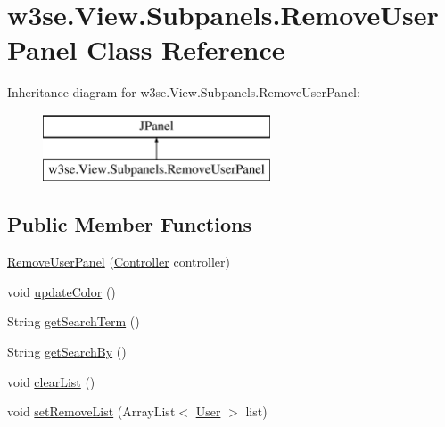 \hypertarget{classw3se_1_1_view_1_1_subpanels_1_1_remove_user_panel}{\section{w3se.\-View.\-Subpanels.\-Remove\-User\-Panel Class Reference}
\label{classw3se_1_1_view_1_1_subpanels_1_1_remove_user_panel}
}
Inheritance diagram for w3se.\-View.\-Subpanels.\-Remove\-User\-Panel\-:\begin{figure}[H]
\begin{center}
\leavevmode
\includegraphics[height=2.000000cm]{classw3se_1_1_view_1_1_subpanels_1_1_remove_user_panel}
\end{center}
\end{figure}
\subsection*{Public Member Functions}
\begin{DoxyCompactItemize}
\item 
\hyperlink{classw3se_1_1_view_1_1_subpanels_1_1_remove_user_panel_a3053dda3608ee0e6590550262883ab78}{Remove\-User\-Panel} (\hyperlink{interfacew3se_1_1_controller_1_1_controller}{Controller} controller)
\item 
void \hyperlink{classw3se_1_1_view_1_1_subpanels_1_1_remove_user_panel_aa8b49f0d2b52d2a1ac4aac5206589516}{update\-Color} ()
\item 
String \hyperlink{classw3se_1_1_view_1_1_subpanels_1_1_remove_user_panel_a7ec050f2ba596e528d47959b40f2924e}{get\-Search\-Term} ()
\item 
String \hyperlink{classw3se_1_1_view_1_1_subpanels_1_1_remove_user_panel_a1a43a479774d85b96c53e4bbcbb8389b}{get\-Search\-By} ()
\item 
void \hyperlink{classw3se_1_1_view_1_1_subpanels_1_1_remove_user_panel_a893be096f290736bad3311b42c24ef73}{clear\-List} ()
\item 
void \hyperlink{classw3se_1_1_view_1_1_subpanels_1_1_remove_user_panel_a09cb16d466b1905e3a2b83b298dbb216}{set\-Remove\-List} (Array\-List$<$ \hyperlink{classw3se_1_1_model_1_1_base_1_1_user}{User} $>$ list)
\end{DoxyCompactItemize}
